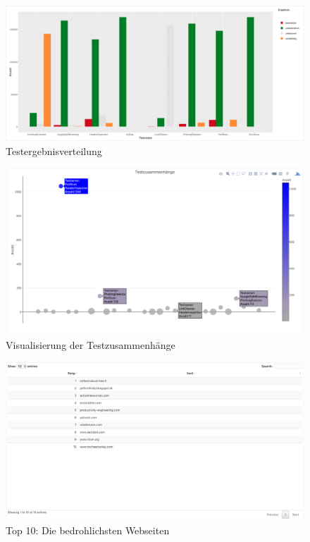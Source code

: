 \begin{figure}[H]
  \centering
  \includegraphics[width=15cm]{images/stats/ergebnisverteilung}
  \caption{Testergebnisverteilung}
  \label{fig:ergebnisverteilung}
\end{figure}


\begin{figure}[H]
  \centering
  \includegraphics[width=15cm]{images/stats/testzusammenhaenge}
  \caption{Visualisierung der Testzusammenhänge}
  \label{fig:testzusammenhaenge}
\end{figure}


\begin{figure}[H]
  \centering
  \includegraphics[width=15cm]{images/stats/top10}
  \caption{Top 10: Die bedrohlichsten Webseiten}
  \label{fig:top10}
\end{figure}



